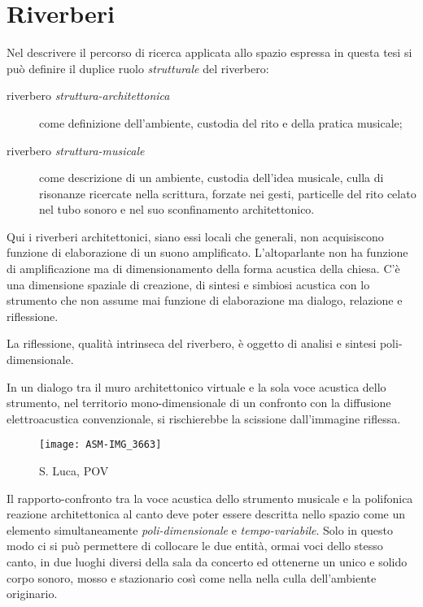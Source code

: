 \section{Riverberi}

Nel descrivere il percorso di ricerca applicata allo spazio espressa in questa
tesi si può definire il duplice ruolo \emph{strutturale} del riverbero:

\begin{description}
	\item [riverbero \emph{struttura-architettonica}]
		come definizione dell'ambiente, custodia del rito e della pratica musicale;
	\item [riverbero \emph{struttura-musicale}]
		come descrizione di un ambiente, custodia dell'idea musicale, culla di risonanze
		ricercate nella scrittura, forzate nei gesti, particelle del rito celato nel tubo
		sonoro e nel suo sconfinamento architettonico.
\end{description}

Qui i riverberi architettonici, siano essi locali che generali, non acquisiscono funzione di elaborazione
di un suono amplificato. L'altoparlante non ha funzione di amplificazione ma di dimensionamento della forma
acustica della chiesa. C'è una dimensione spaziale di creazione, di sintesi e simbiosi acustica con lo strumento
che non assume mai funzione di elaborazione ma dialogo, relazione e riflessione.

La riflessione, qualità intrinseca del riverbero, è oggetto di analisi e sintesi poli-dimensionale. 

In un dialogo tra il muro architettonico virtuale e la sola voce acustica dello strumento,
nel territorio mono-dimensionale di un confronto con la diffusione elettroacustica
convenzionale, si rischierebbe la scissione dall'immagine riflessa.

\clearpage

\begin{figure}
\centering
{\texttt{[image: ASM-IMG\_3663]}}
\caption[S. Luca, POV]{S. Luca, POV}
\label{fig:slucapov}
\end{figure}

Il rapporto-confronto tra la voce acustica dello strumento musicale e la polifonica reazione 
architettonica al canto deve poter essere descritta nello spazio come un elemento simultaneamente
\emph{poli-dimensionale} e \emph{tempo-variabile}. Solo in questo modo ci si può permettere
di collocare le due entità, ormai voci dello stesso canto, in due luoghi diversi
della sala da concerto ed ottenerne un unico e solido corpo sonoro, mosso e stazionario così
come nella nella culla dell'ambiente originario. 

